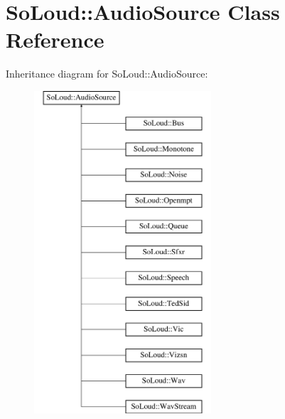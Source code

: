 \hypertarget{class_so_loud_1_1_audio_source}{}\section{So\+Loud\+::Audio\+Source Class Reference}
\label{class_so_loud_1_1_audio_source}
Inheritance diagram for So\+Loud\+::Audio\+Source\+:\begin{figure}[H]
\begin{center}
\leavevmode
\includegraphics[height=12.000000cm]{class_so_loud_1_1_audio_source}
\end{center}
\end{figure}
